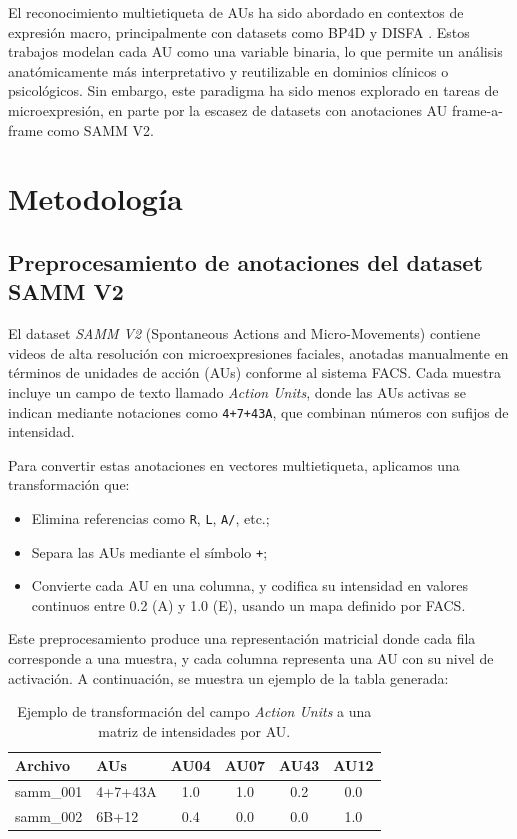 \documentclass[conference]{IEEEtran}
\begin{document}
El reconocimiento multietiqueta de AUs ha sido abordado en contextos de expresión macro, principalmente con datasets como BP4D y DISFA \cite{jaiswal2022deep}. Estos trabajos modelan cada AU como una variable binaria, lo que permite un análisis anatómicamente más interpretativo y reutilizable en dominios clínicos o psicológicos. Sin embargo, este paradigma ha sido menos explorado en tareas de microexpresión, en parte por la escasez de datasets con anotaciones AU frame-a-frame como SAMM V2. 

\section{Metodología}
\subsection{Preprocesamiento de anotaciones del dataset SAMM V2}

El dataset \textit{SAMM V2} (Spontaneous Actions and Micro-Movements) contiene videos de alta resolución con microexpresiones faciales, anotadas manualmente en términos de unidades de acción (AUs) conforme al sistema FACS. Cada muestra incluye un campo de texto llamado \textit{Action Units}, donde las AUs activas se indican mediante notaciones como \texttt{4+7+43A}, que combinan números con sufijos de intensidad.

Para convertir estas anotaciones en vectores multietiqueta, aplicamos una transformación que:
\begin{itemize}
  \item Elimina referencias como \texttt{R}, \texttt{L}, \texttt{A/}, etc.;
  \item Separa las AUs mediante el símbolo \texttt{+};
  \item Convierte cada AU en una columna, y codifica su intensidad en valores continuos entre 0.2 (A) y 1.0 (E), usando un mapa definido por FACS.
\end{itemize}

Este preprocesamiento produce una representación matricial donde cada fila corresponde a una muestra, y cada columna representa una AU con su nivel de activación. A continuación, se muestra un ejemplo de la tabla generada:

\begin{table}[h]
\centering
\begin{tabular}{l|l|c|c|c|c}
\textbf{Archivo} & \textbf{AUs} & AU04 & AU07 & AU43 & AU12 \\
\hline
samm\_001 & 4+7+43A & 1.0 & 1.0 & 0.2 & 0.0 \\
samm\_002 & 6B+12 & 0.4 & 0.0 & 0.0 & 1.0 \\
\end{tabular}
\caption{Ejemplo de transformación del campo \textit{Action Units} a una matriz de intensidades por AU.}
\end{table}
\end{document}

